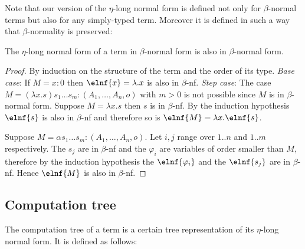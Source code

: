 Note that our version of the $\eta$-long normal form is defined not only for $\beta$-normal terms but also for any simply-typed term.
Moreover it is defined in such a way that $\beta$-normality is preserved:
\begin{lemma}
The $\eta$-long normal form of a term in $\beta$-normal form is also in $\beta$-normal form.
\end{lemma}
\begin{proof}
By induction on the structure of the term and the order of its type.
\emph{Base case}:
If $M=x:0$ then $\elnf{x} = \lambda . x$ is also in $\beta$-nf.
\emph{Step case}:
The case $M = (\lambda x . s) s_1 \ldots s_m : (A_1,\ldots,A_n,o)$ with $m>0$ is not possible since $M$ is in
$\beta$-normal form.
Suppose $M = \lambda x . s$ then $s$ is in $\beta$-nf. By the induction hypothesis $\elnf{s}$ is also in $\beta$-nf and therefore
so is $\elnf{M} = \lambda x . \elnf{s}$.

Suppose $M= \alpha s_1 \ldots s_m : (A_1,\ldots,A_n,o)$. Let $i,j$
range over $1..n$ and $1..m$ respectively. The $s_j$ are in
$\beta$-nf and the $\varphi_i$ are variables of order smaller than
$M$, therefore by the induction hypothesis the $\elnf{\varphi_i}$ and
the $\elnf{s_j}$ are in $\beta$-nf. Hence $\elnf{M}$ is also in
$\beta$-nf.
\end{proof}



\subsection{Computation tree}
The computation tree of a term is a certain tree representation of its
$\eta$-long normal form. It is defined as follows:


